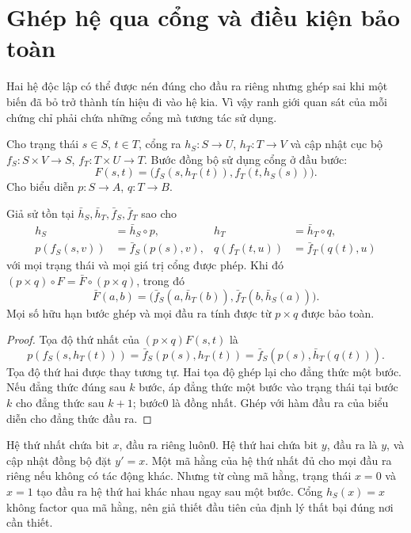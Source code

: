 \section{Ghép hệ qua cổng và điều kiện bảo toàn}\label{sec:composition}
Hai hệ độc lập có thể được nén đúng cho đầu ra riêng nhưng ghép sai khi một biến đã bỏ trở thành tín hiệu đi vào hệ kia. Vì vậy ranh giới quan sát của mỗi chứng chỉ phải chứa những cổng mà tương tác sử dụng.

Cho trạng thái $s\in S$, $t\in T$, cổng ra $h_S:S\to U$, $h_T:T\to V$ và cập nhật cục bộ $f_S:S\times V\to S$, $f_T:T\times U\to T$. Bước đồng bộ sử dụng cổng ở đầu bước:
\[
F(s,t)=\bigl(f_S(s,h_T(t)),f_T(t,h_S(s))\bigr).
\]
Cho biểu diễn $p:S\to A$, $q:T\to B$.

\begin{theorem}\label{thm:composition}
Giả sử tồn tại $\bar h_S,\bar h_T,\bar f_S,\bar f_T$ sao cho
\begin{align*}
h_S&=\bar h_S\circ p,& h_T&=\bar h_T\circ q,\\
p(f_S(s,v))&=\bar f_S(p(s),v),&
q(f_T(t,u))&=\bar f_T(q(t),u)
\end{align*}
với mọi trạng thái và mọi giá trị cổng được phép. Khi đó $(p\times q)\circ F=\bar F\circ(p\times q)$, trong đó
\[
\bar F(a,b)=\bigl(\bar f_S(a,\bar h_T(b)),\bar f_T(b,\bar h_S(a))\bigr).
\]
Mọi số hữu hạn bước ghép và mọi đầu ra tính được từ $p\times q$ được bảo toàn.
\end{theorem}
\begin{proof}
Tọa độ thứ nhất của $(p\times q)F(s,t)$ là
\[
p(f_S(s,h_T(t)))=\bar f_S(p(s),h_T(t))
=\bar f_S(p(s),\bar h_T(q(t))).
\]
Tọa độ thứ hai được thay tương tự. Hai tọa độ ghép lại cho đẳng thức một bước. Nếu đẳng thức đúng sau $k$ bước, áp đẳng thức một bước vào trạng thái tại bước $k$ cho đẳng thức sau $k+1$; bước0 là đồng nhất. Ghép với hàm đầu ra của biểu diễn cho đẳng thức đầu ra.
\end{proof}

\begin{example}
Hệ thứ nhất chứa bit $x$, đầu ra riêng luôn0. Hệ thứ hai chứa bit $y$, đầu ra là $y$, và cập nhật đồng bộ đặt $y'=x$. Một mã hằng của hệ thứ nhất đủ cho mọi đầu ra riêng nếu không có tác động khác. Nhưng từ cùng mã hằng, trạng thái $x=0$ và $x=1$ tạo đầu ra hệ thứ hai khác nhau ngay sau một bước. Cổng $h_S(x)=x$ không factor qua mã hằng, nên giả thiết đầu tiên của định lý thất bại đúng nơi cần thiết.
\end{example}

